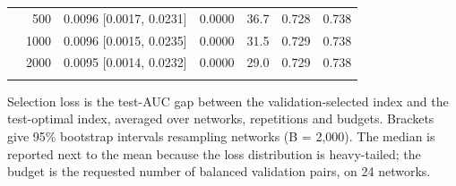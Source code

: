 \begin{table}[htbp]
\begin{tabular}{l r l r r r r}
 & 500 & 0.0096 [0.0017, 0.0231] & 0.0000 & 36.7 & 0.728 & 0.738 \\
 & 1000 & 0.0096 [0.0015, 0.0235] & 0.0000 & 31.5 & 0.729 & 0.738 \\
 & 2000 & 0.0095 [0.0014, 0.0232] & 0.0000 & 29.0 & 0.729 & 0.738 \\
\addlinespace[2pt]
\bottomrule
\end{tabular}
\par\vspace{2pt}\begin{minipage}{\linewidth}\footnotesize Selection loss is the test-AUC gap between the validation-selected index and the test-optimal index, averaged over networks, repetitions and budgets. Brackets give 95\% bootstrap intervals resampling networks (B = 2{,}000). The median is reported next to the mean because the loss distribution is heavy-tailed; the budget is the requested number of balanced validation pairs, on 24 networks.\end{minipage}
\end{table}
